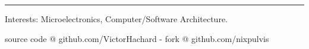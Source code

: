 \documentclass[10pt,letterpaper]{article}
\newenvironment{indentsection}[1]
{\begin{list}{}
  {\setlength{\leftmargin}{#1}} \item[]
}
{\end{list}}
\begin{document}


\hrule
\begin{indentsection}{\parindent}
\begin{description*}
\item[Interests:]
  Microelectronics, Computer/Software Architecture.
\end{description*}
\end{indentsection}


\begin{center}
\footnotesize source code @ github.com/VictorHachard - fork @ github.com/nixpulvis
\end{center}
\end{document}
